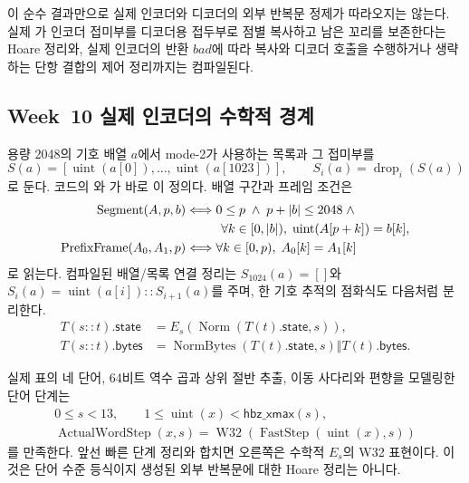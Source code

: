 이 순수 결과만으로 실제 인코더와 디코더의 외부 반복문 정제가 따라오지는
않는다. 실제 가 인코더 접미부를 디코더용
접두부로 점별 복사하고 남은 꼬리를 보존한다는 Hoare 정리와, 실제 인코더의
반환 \(bad\)에 따라 복사와 디코더 호출을 수행하거나 생략하는 단항 결합의 제어
정리까지는 컴파일된다.

\subsection{Week~10 실제 인코더의 수학적 경계}

용량 2048의 기호 배열 \(a\)에서 mode-2가 사용하는 목록과 그 접미부를
\[
  S(a)=[\operatorname{uint}(a[0]),\ldots,
        \operatorname{uint}(a[1023])],\qquad
  S_i(a)=\operatorname{drop}_i(S(a))
\]
로 둔다. 코드의 와
가 바로 이 정의다. 배열 구간과 프레임 조건은
\[
\begin{aligned}
  \operatorname{Segment}(A,p,b)
    &\Longleftrightarrow
      0\le p\;\land\;p+|b|\le2048\;\land\\
    &\hspace{2.8em}\forall k\in[0,|b|),\;
      \operatorname{uint}(A[p+k])=b[k],\\
  \operatorname{PrefixFrame}(A_0,A_1,p)
    &\Longleftrightarrow
      \forall k\in[0,p),\;A_0[k]=A_1[k]
\end{aligned}
\]
로 읽는다. 컴파일된 배열/목록 연결 정리는
\(S_{1024}(a)=[]\)와
\(S_i(a)=\operatorname{uint}(a[i])::S_{i+1}(a)\)를 주며, 한 기호 추적의
점화식도 다음처럼 분리한다.
\[
\begin{aligned}
  T(s::t).\mathsf{state}
    &=E_s(\operatorname{Norm}(T(t).\mathsf{state},s)),\\
  T(s::t).\mathsf{bytes}
    &=\operatorname{NormBytes}(T(t).\mathsf{state},s)
      \Vert T(t).\mathsf{bytes}.
\end{aligned}
\]

실제 표의 네 단어, 64비트 역수 곱과 상위 절반 추출, 이동 사다리와 편향을
모델링한 단어 단계는
\[
\begin{gathered}
  0\le s<13,\qquad
  1\le\operatorname{uint}(x)<\mathsf{hbz\_xmax}(s),\\
  \operatorname{ActualWordStep}(x,s)
   =\operatorname{W32}
      (\operatorname{FastStep}(\operatorname{uint}(x),s))
\end{gathered}
\]
를 만족한다. 앞선 빠른 단계 정리와 합치면 오른쪽은 수학적 \(E_s\)의 W32
표현이다. 이것은 단어 수준 등식이지 생성된 외부 반복문에 대한 Hoare 정리는
아니다.

